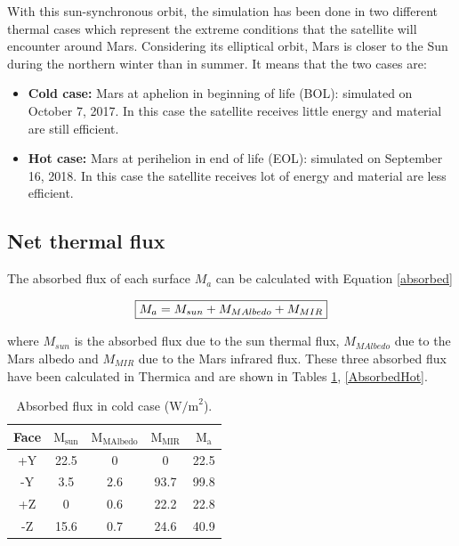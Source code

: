 \documentclass[a4paper, oneside, 11pt]{article}
\begin{document}
With this sun-synchronous orbit, the simulation has been done in two different thermal cases which represent the extreme conditions that the satellite will encounter around Mars. Considering its elliptical orbit, Mars is closer to the Sun during the northern winter than in summer. It means that the two cases are:
\begin{itemize}
    \item \textbf{Cold case:} Mars at aphelion in beginning of life (BOL): simulated on October 7, 2017. In this case the satellite receives little energy and material are still efficient.
    \item \textbf{Hot case:} Mars at perihelion in end of life (EOL): simulated on September 16, 2018. In this case the satellite receives lot of energy and material are less efficient.
\end{itemize}

\subsection{ Net thermal flux}

\medskip

The absorbed flux of each surface $M_a$ can be calculated with Equation \ref{absorbed}

\begin{equation}
\fbox{$M_a=M_{sun}+M_{MAlbedo}+M_{MIR}$}
\label{absorbed}
\end{equation}

where $M_{sun}$ is the absorbed flux due to the sun thermal flux, $M_{MAlbedo}$ due to the Mars albedo and $M_{MIR}$ due to the Mars infrared flux. These three absorbed flux have been calculated in Thermica and are shown in Tables \ref{AbsorbedCold}, \ref{AbsorbedHot}. 

\begin{table}[!h]
 \caption{Absorbed flux in cold case ($\text{W/m}^\text{2}$).}
 \label{AbsorbedCold}
\centering \begin{tabular}{| c | c |c |c |c |}
  \hline
Face &  $\text{M}_\text{{sun}}$ & $\text{M}_\text{{MAlbedo}}$ & $\text{M}_\text{{MIR}}$ & $\text{M}_\text{a}$ \\
   \hline
+Y & 22.5  & 0 & 0 & 22.5 \\
   \hline
-Y & 3.5  & 2.6 & 93.7 & 99.8 \\
   \hline
+Z & 0  & 0.6 & 22.2 & 22.8 \\
   \hline
-Z &  15.6 &  0.7 & 24.6 & 40.9 \\
   \hline
\end{tabular}
\end{table}
\end{document}
